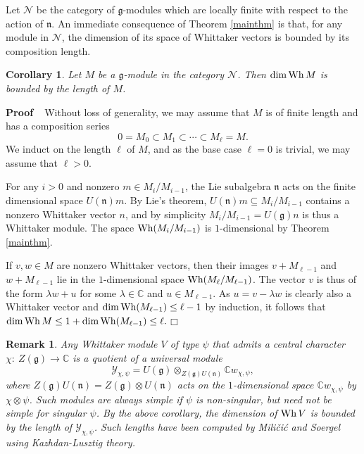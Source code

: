 \documentclass[11pt]{article}
\newtheorem{corollary}[equation]{Corollary}
\newtheorem{remark}[equation]{Remark}
\numberwithin{equation}{section}
\newcommand{\fg}{\mathfrak{g}}
\newcommand{\ot}{\otimes}
\newcommand{\proof}{{\bf Proof\ \ }}
\newcommand{\qed}{\hfill $\Box$}
\newcommand{\mf}{\mathfrak}
\begin{document}
\bigskip

Let $\mathcal{N}$ be the category of $\fg$-modules which are locally finite with respect to the action of $\mf{n}$.  An immediate consequence of Theorem \ref{mainthm} is that, for any module in $\mathcal{N}$, the dimension of its space of Whittaker vectors is bounded by its composition length.

\begin{corollary}
Let $M$ be a $\fg$-module in the category $\mathcal{N}$.  Then $\dim\hbox{Wh}\,M$ is bounded by the length of $M$.
  \end{corollary}

\noindent
\proof Without loss of generality, we may assume that $M$ is of finite length and has a composition series
$$0=M_0\subset M_1\subset\cdots\subset M_\ell=M.$$
We induct on the length $\ell$ of $M$, and as the base case $\ell=0$ is trivial, we may assume that $\ell>0$.

For any $i>0$ and nonzero $m\in M_i/M_{i-1}$, the Lie subalgebra $\mf{n}$ acts on the finite dimensional space $U(\mf{n})m$.  By Lie's theorem, $U(\mf{n})m\subseteq M_i/M_{i-1}$ contains a nonzero Whittaker vector $n$, and by simplicity $M_i/M_{i-1}=U(\fg)n$ is thus a Whittaker module.  The space $\hbox{Wh}(M_i/M_{i-1})$ is $1$-dimensional by Theorem \ref{mainthm}.

If $v,w\in M$ are nonzero Whittaker vectors, then their images $v+M_{\ell-1}$ and $w+M_{\ell-1}$ lie in the $1$-dimensional space $\hbox{Wh}(M_\ell/M_{\ell-1})$. The vector $v$ is thus of the form $\lambda w + u$ for some $\lambda\in\mathbb{C}$ and $u\in M_{\ell-1}$.  As $u=v-\lambda w$ is clearly also a Whittaker vector and $\dim\hbox{Wh}(M_{\ell-1})\leq \ell-1$ by induction, it follows that $\dim\hbox{Wh}\,M\leq 1+\dim\hbox{Wh}(M_{\ell-1})\leq\ell.$\qed

\bigskip

\begin{remark}{\em 
  Any Whittaker module $V$ of type $\psi$ that admits a central character $\chi:\ Z(\fg)\rightarrow \mathbb{C}$ is a quotient of a universal module
  $$\mathcal{Y}_{\chi,\psi}=U(\fg)\ot_{Z(\fg)U(\mf{n})}\mathbb{C}w_{\chi,\psi},$$
  where $Z(\fg)U(\mf{n})=Z(\fg)\ot U(\mf{n})$ acts on the $1$-dimensional space $\mathbb{C}w_{\chi,\psi}$ by $\chi\ot\psi$.  Such modules are always simple if $\psi$ is non-singular, but need not be simple for singular $\psi$.  By the above corollary, the dimension of $\hbox{Wh}\,V$ is bounded by the length of $\mathcal{Y}_{\chi,\psi}$.  Such lengths have been computed by Mili\v{c}i\'c and Soergel \cite{milicic-soergel97} using Kazhdan-Lusztig theory.
  }\end{remark}
\end{document}
